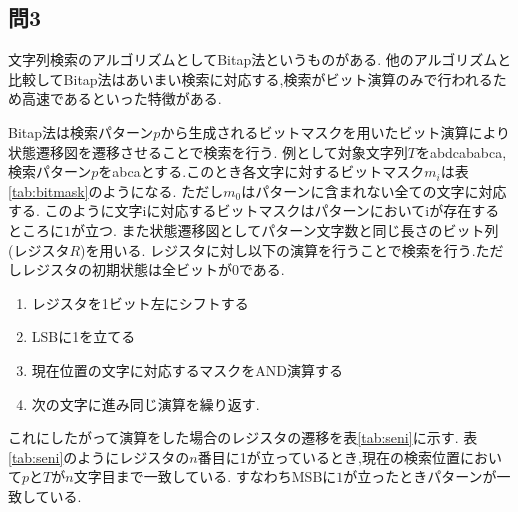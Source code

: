 \subsection*{問3}
文字列検索のアルゴリズムとしてBitap法というものがある.
他のアルゴリズムと比較してBitap法はあいまい検索に対応する,検索がビット演算のみで行われるため高速であるといった特徴がある.\cite{Bitap:online}

Bitap法は検索パターン$p$から生成されるビットマスクを用いたビット演算により状態遷移図を遷移させることで検索を行う.
例として対象文字列$T$をabdcababca, 検索パターン$p$をabcaとする.このとき各文字に対するビットマスク$m_i$は表\ref{tab:bitmask}のようになる.
ただし$m_0$はパターンに含まれない全ての文字に対応する.
このように文字iに対応するビットマスクはパターンにおいてiが存在するところに$1$が立つ.
また状態遷移図としてパターン文字数と同じ長さのビット列(レジスタ$R$)を用いる.
レジスタに対し以下の演算を行うことで検索を行う.ただしレジスタの初期状態は全ビットが$0$である.\cite{Bitap:online}
\begin{enumerate}
  \item レジスタを1ビット左にシフトする
  \item LSBに1を立てる
  \item 現在位置の文字に対応するマスクをAND演算する
  \item 次の文字に進み同じ演算を繰り返す.
\end{enumerate}
これにしたがって演算をした場合のレジスタの遷移を表\ref{tab:seni}に示す.
表\ref{tab:seni}のようにレジスタの$n$番目に1が立っているとき,現在の検索位置において$p$と$T$が$n$文字目まで一致している.
すなわちMSBに$1$が立ったときパターンが一致している.

